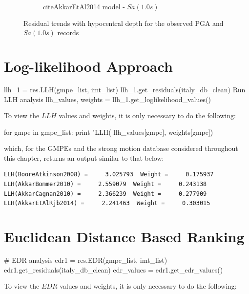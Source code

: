 \begin{figure}[htb]
\begin{subfigure}[b]{0.49\textwidth}
     \caption{citeAkkarEtAl2014 model - $Sa \left( {1.0 s} \right)$}
      \label{fig:sa1_depth_akkar2014}
  \end{subfigure}
  \caption{Residual trends with hypocentral depth for the observed PGA and $Sa \left( {1.0 s} \right)$ records}
  \label{fig:depth_resid}
\end{figure}

\section{Log-likelihood Approach}
\label{sec:llh}

\begin{python}[frame=single]
llh_1 = res.LLH(gmpe_list, imt_list)
llh_1.get_residuals(italy_db_clean)
 Run LLH analysis
llh_values, weights = llh_1.get_loglikelihood_values()
\end{python}

To view the $LLH$ values and weights, it is only necessary to do the following:

\begin{python}
for gmpe in gmpe_list:
    print "LLH(%
                                               llh_values[gmpe],     
                                               weights[gmpe])
\end{python}

\noindent which, for the GMPEs and the strong motion database considered throughout this chapter, returns an output similar to that below:

\begin{verbatim}
LLH(BooreAtkinson2008) =     3.025793  Weight =     0.175937
LLH(AkkarBommer2010) =     2.559079  Weight =     0.243138
LLH(AkkarCagnan2010) =     2.366239  Weight =     0.277909
LLH(AkkarEtAlRjb2014) =     2.241463  Weight =     0.303015
\end{verbatim}


\section{Euclidean Distance Based Ranking}
\label{sec:edr}

\begin{python}[frame=single]
# EDR analysis
edr1 = res.EDR(gmpe_list, imt_list)
edr1.get_residuals(italy_db_clean)
edr_values = edr1.get_edr_values()
\end{python}

To view the $EDR$ values and weights, it is only necessary to do the following:

